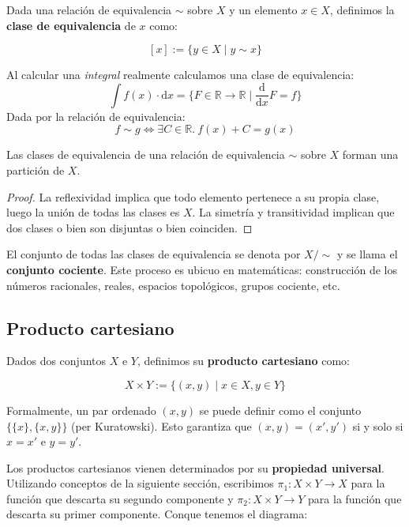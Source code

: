 \documentclass[10pt]{article}
\newcommand{\diff}{\mathrm{d}}
\newcommand{\R}{\mathbb{R}}
\begin{document}
Dada una relación de equivalencia $\sim$ sobre $X$ y un elemento $x \in X$, definimos la \textbf{clase de equivalencia} de $x$ como:

\[
[x] := \{ y \in X \mid y \sim x \}
\]

\begin{example}
  Al calcular una \textit{integral} realmente calculamos una clase de equivalencia:
  \[ \int f(x) \cdot \diff x = \{ F \in \R \to \R \mid \frac{\diff}{\diff x}F = f \} \]
  Dada por la relación de equivalencia:
  \[ f \sim g \iff \exists C \in \R.\ f(x) + C = g(x)  \]
\end{example}

\begin{theorem}
Las clases de equivalencia de una relación de equivalencia $\sim$ sobre $X$ forman una partición de $X$.
\end{theorem}

\begin{proof}
La reflexividad implica que todo elemento pertenece a su propia clase, luego la unión de todas las clases es $X$.
La simetría y transitividad implican que dos clases o bien son disjuntas o bien coinciden.
\end{proof}

El conjunto de todas las clases de equivalencia se denota por $X/{\sim}$ y se llama el \textbf{conjunto cociente}.
Este proceso es ubicuo en matemáticas: construcción de los números racionales, reales, espacios topológicos, grupos cociente, etc.

\subsection{Producto cartesiano}

Dados dos conjuntos $X$ e $Y$, definimos su \textbf{producto cartesiano} como:

\[ X \times Y := \{ (x,y) \mid x \in X, y \in Y \} \]

\begin{remark}
 Formalmente, un par ordenado $(x,y)$ se puede definir como el conjunto $\{\{x\},\{x,y\}\}$ (per Kuratowski).
 Esto garantiza que $(x,y)=(x',y')$ si y solo si $x=x'$ e $y=y'$.
\end{remark}

Los productos cartesianos vienen determinados por su \textbf{propiedad universal}. Utilizando conceptos de la siguiente sección, escribimos $ \pi_1 : X \times Y \to X $ para la
función que descarta su segundo componente y $ \pi_2 : X \times Y \to Y $ para la función que descarta su primer componente. Conque tenemos el diagrama:
\end{document}
